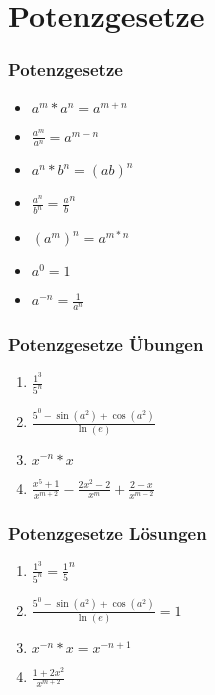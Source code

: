 \section{Potenzgesetze}
\begin{frame}
    \frametitle{Potenzgesetze}
	\begin{itemize}
		\setlength\itemsep{1em}
		\item $a^m * a^n = a^{m+n}$
		\item $\frac{a^m}{a^n} = a^{m-n}$
		\item $a^n * b^n = (ab)^n$
		\item $\frac{a^n}{b^n} = \frac{a}{b}^n$
		\item $(a^m)^n = a^{m*n}$
		\item $a^0 = 1$
		\item $a^{-n} = \frac{1}{a^n}$
	\end{itemize}
\end{frame}

\begin{frame}
    \frametitle{Potenzgesetze Übungen}
	\begin{enumerate}
		\setlength\itemsep{1em}
		\item $\frac{1^3}{5^n}$
		\item $\frac{5^0- \sin(a^2) + \cos(a^2)}{\ln(e)}$
		\item $x^{-n} * x$
		\item $\frac{x^5 +1}{x^{m+2}} - \frac{2x^2-2}{x^m} + \frac{2-x}{x^{m-2}}$
	\end{enumerate}
\end{frame}

\begin{frame}
    \frametitle{Potenzgesetze Lösungen}
	\begin{enumerate}
		\setlength\itemsep{1em}
		\item $\frac{1^3}{5^n} = \frac{1}{5}^n$
		\item $\frac{5^0- \sin(a^2) + \cos(a^2)}{\ln(e)} = 1$
		\item $x^{-n} * x = x^{-n+1}$
		\item $\frac{1+2x^2}{x^{m+2}}$
	\end{enumerate}
\end{frame}

